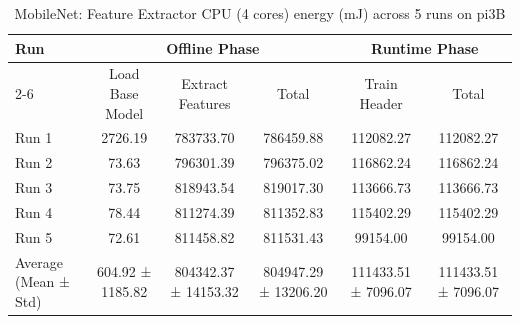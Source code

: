 \begin{table}[t]
\centering
\caption{MobileNet: Feature Extractor CPU (4 cores) energy (mJ) across 5 runs on pi3B}
\label{tab:energy_mobilenet_CPU4_pi3B}
\begin{tabular}{lccccc}
\hline
\multirow{2}{*}{Run} & \multicolumn{3}{c}{Offline Phase} & \multicolumn{2}{c}{Runtime Phase} \\
\cline{2-6}
 & Load Base Model & Extract Features & Total & Train Header & Total \\
\hline
  Run 1                  & 2726.19        & 783733.70      & 786459.88      & 112082.27      & 112082.27      \\
  Run 2                  & 73.63          & 796301.39      & 796375.02      & 116862.24      & 116862.24      \\
  Run 3                  & 73.75          & 818943.54      & 819017.30      & 113666.73      & 113666.73      \\
  Run 4                  & 78.44          & 811274.39      & 811352.83      & 115402.29      & 115402.29      \\
  Run 5                  & 72.61          & 811458.82      & 811531.43      & 99154.00       & 99154.00       \\
\hline
  Average (Mean ± Std)   & 604.92 ± 1185.82 & 804342.37 ± 14153.32 & 804947.29 ± 13206.20 & 111433.51 ± 7096.07 & 111433.51 ± 7096.07 \\
\hline
\end{tabular}
\end{table}

